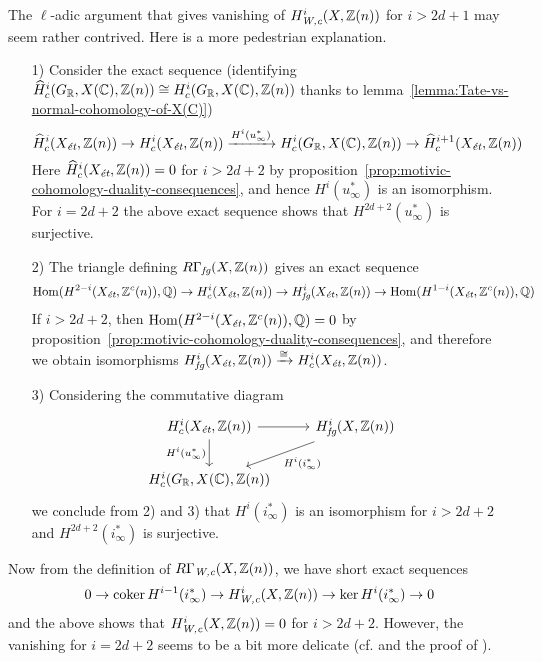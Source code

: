 \documentclass{article}
\numberwithin{equation}{section}
\begin{document}
\begin{remark}
  The $\ell$-adic argument that gives vanishing of $H^i_\Wc (X, \ZZ(n))$ for
  $i > 2d+1$ may seem rather contrived. Here is a more pedestrian explanation.

  \begin{enumerate}
  \item[1)] Consider the exact sequence
    (identifying
    $\widehat{H}^i_c (G_\RR, X (\CC), \ZZ (n)) \cong H^i_c (G_\RR, X (\CC), \ZZ (n))$
    thanks to lemma~\ref{lemma:Tate-vs-normal-cohomology-of-X(C)})
    \[ \widehat{H}^i_c (X_\et, \ZZ(n)) \to H^i_c (X_\et, \ZZ(n))
      \xrightarrow{H^i (u_\infty^*)} H^i_c (G_\RR, X (\CC), \ZZ (n)) \to
      \widehat{H}^{i+1}_c (X_\et, \ZZ(n)) \]
    Here $\widehat{H}^i_c (X_\et, \ZZ(n)) = 0$ for $i > 2d+2$
    by proposition~\ref{prop:motivic-cohomology-duality-consequences},
    and hence $H^i (u_\infty^*)$ is an isomorphism.
    For $i = 2d+2$ the above exact sequence shows that $H^{2d+2} (u_\infty^*)$
    is surjective.

  \item[2)] The triangle defining $R\Gamma_\fg (X, \ZZ(n))$ gives an exact sequence
    \[ \Hom (H^{2-i} (X_\et, \ZZ^c (n)), \QQ) \to
      H^i_c (X_\et, \ZZ(n)) \to
      H^i_\fg (X_\et, \ZZ(n)) \to
      \Hom (H^{1-i} (X_\et, \ZZ^c (n)), \QQ) \]
    If $i > 2d + 2$, then $\Hom (H^{2-i} (X_\et, \ZZ^c (n)), \QQ) = 0$ by
    proposition~\ref{prop:motivic-cohomology-duality-consequences},
    and therefore we obtain isomorphisms
    $H^i_\fg (X_\et, \ZZ(n)) \xrightarrow{\cong} H^i_c (X_\et, \ZZ(n))$.

  \item[3)] Considering the commutative diagram
    \[ \begin{tikzcd}
        H^i_c (X_\et, \ZZ(n)) \ar{r}\ar{d}[swap]{H^i (u_\infty^*)} & H^i_\fg (X, \ZZ(n))\ar{dl}{H^i (i_\infty^*)} \\
        H^i_c (G_\RR, X (\CC), \ZZ (n))
      \end{tikzcd} \]
    we conclude from 2) and 3) that $H^i (i_\infty^*)$ is an isomorphism for
    $i > 2d+2$ and $H^{2d+2} (i_\infty^*)$ is surjective.
  \end{enumerate}

  Now from the definition of $R\Gamma_\Wc (X, \ZZ(n))$, we have short exact
  sequences
  \[ 0 \to \coker H^{i-1} (i_\infty^*) \to
    H^i_\Wc (X, \ZZ(n)) \to
    \ker H^i (i_\infty^*) \to 0 \]
  and the above shows that $H^i_\Wc (X, \ZZ(n)) = 0$ for $i > 2d+2$.
  However, the vanishing for $i = 2d+2$ seems to be a bit more delicate
  (cf. \cite[p.\,991]{Kahn-2003-equivalences} and the proof of
  \cite[Theorem~7.3]{Geisser-2004}).
\end{remark}
\end{document}
